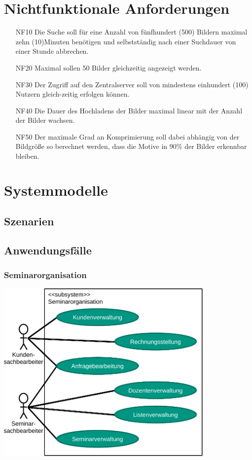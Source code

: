 \documentclass[parskip=full]{scrartcl}
\begin{document}
\section{Nichtfunktionale Anforderungen}
\begin{itemize}[nosep]
\item[NF10] Die Suche soll für eine Anzahl von fünfhundert (500) Bildern maximal zehn (10)Minuten benötigen und selbstständig nach einer Suchdauer von einer Stunde abbrechen.
\item[NF20] Maximal sollen 50  Bilder  gleichzeitig  angezeigt  werden.
\item[NF30] Der Zugriff auf den Zentralserver soll von mindestens einhundert (100) Nutzern gleich-zeitig erfolgen können.
\item[NF40] Die Dauer des Hochladens der Bilder maximal linear mit der Anzahl der Bilder wachsen.
\item[NF50] Der maximale Grad an Komprimierung soll dabei abhängig von der Bildgröße so berechnet werden, dass die Motive in 90\% der Bilder erkennbar bleiben.
\end{itemize}

\section{Systemmodelle}

\subsection{Szenarien}

\subsection{Anwendungsfälle}
\subsubsection{Seminarorganisation}
\begin{center}
\includegraphics[width=0.8\textwidth]{szenario_seminarorganisation.pdf}
\end{center}
\end{document}
